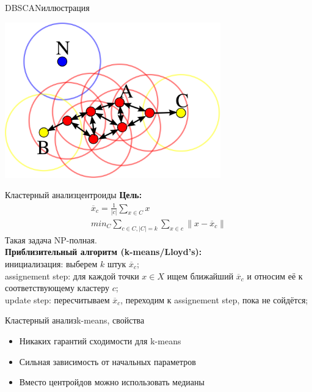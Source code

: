 \documentclass[14pt, fleqn, xcolor={dvipsnames, table}]{beamer}
\begin{document}
\begin{frame}{DBSCAN}{иллюстрация}
\begin{center}\includegraphics[width=0.7\textwidth]{dbscan.png}\end{center}
\end{frame}


\begin{frame}{Кластерный анализ}{центроиды}
\small
\textbf{Цель:}
$$\begin{array}{l}
  \overline{x}_c = \frac{1}{|c|}\sum_{x \in C} x \\
  min_C \sum_{c \in C, |C| = k} \sum_{x \in c} \|x - \overline{x}_c\|
\end{array}$$
Такая задача NP-полная. \\
\textbf{Приблизительный алгоритм (k-means/Lloyd's):} \\
{\color{blue}инициализация:} выберем $k$ штук $\overline{x}_c$; \\
{\color{blue}assignement step:} для каждой точки $x \in X$ ищем ближайший $\overline{x}_c$ и относим её к соответствующему кластеру $c$; \\
{\color{blue}update step:} пересчитываем $\overline{x}_c$, переходим к assignement step, пока не сойдётся; \\
\end{frame}

\begin{frame}{Кластерный анализ}{k-means, свойства}
\begin{itemize}
  \item Никаких гарантий сходимости для k-means
  \item Сильная зависимость от начальных параметров
  \item Вместо центройдов можно использовать медианы
\end{itemize}
\end{frame}
\end{document}
